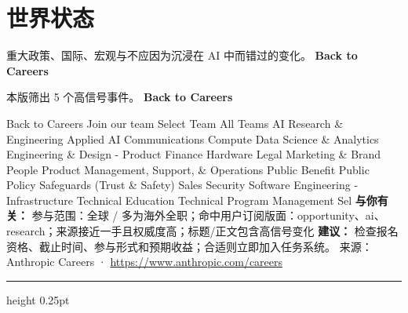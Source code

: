 \documentclass[10.5pt]{ctexart}
\begin{document}
\section*{世界状态}
{\color{ormuted} 重大政策、国际、宏观与不应因为沉浸在 AI 中而错过的变化。}
\vspace{2mm}
{\LARGE\bfseries Back to Careers}\par
\vspace{1mm}
{\color{ormuted} 本版筛出 5 个高信号事件。}
\vspace{3mm}
{\Large\bfseries Back to Careers}\par
Back to Careers Join our team Select Team All Teams AI Research \& Engineering Applied AI Communications Compute Data Science \& Analytics Engineering \& Design - Product Finance Hardware Legal Marketing \& Brand People Product Management, Support, \& Operations Public Benefit Public Policy Safeguards (Trust \& Safety) Sales Security Software Engineering - Infrastructure Technical Education Technical Program Management Sel
\textbf{与你有关：} 参与范围：全球 / 多为海外全职；命中用户订阅版面：opportunity、ai、research；来源接近一手且权威度高；标题/正文包含高信号变化
\textbf{建议：} 检查报名资格、截止时间、参与形式和预期收益；合适则立即加入任务系统。
{\footnotesize\color{ormuted} 来源：Anthropic Careers · \url{https://www.anthropic.com/careers}}
\vspace{4mm}
\hrule height 0.25pt
\vspace{3mm}
\end{document}
